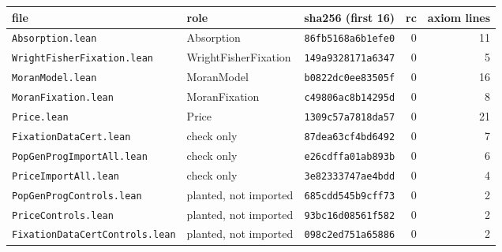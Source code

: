 \begin{tabular}{llrrr}
\toprule
file & role & sha256 (first 16) & rc & axiom lines\\
\midrule
\texttt{Absorption.lean} & Absorption & \texttt{86fb5168a6b1efe0} & 0 & 11 \\
\texttt{WrightFisherFixation.lean} & WrightFisherFixation & \texttt{149a9328171a6347} & 0 & 5 \\
\texttt{MoranModel.lean} & MoranModel & \texttt{b0822dc0ee83505f} & 0 & 16 \\
\texttt{MoranFixation.lean} & MoranFixation & \texttt{c49806ac8b14295d} & 0 & 8 \\
\texttt{Price.lean} & Price & \texttt{1309c57a7818da57} & 0 & 21 \\
\texttt{FixationDataCert.lean} & check only & \texttt{87dea63cf4bd6492} & 0 & 7 \\
\texttt{PopGenProgImportAll.lean} & check only & \texttt{e26cdffa01ab893b} & 0 & 6 \\
\texttt{PriceImportAll.lean} & check only & \texttt{3e82333747ae4bdd} & 0 & 4 \\
\texttt{PopGenProgControls.lean} & planted, not imported & \texttt{685cdd545b9cff73} & 0 & 2 \\
\texttt{PriceControls.lean} & planted, not imported & \texttt{93bc16d08561f582} & 0 & 2 \\
\texttt{FixationDataCertControls.lean} & planted, not imported & \texttt{098c2ed751a65886} & 0 & 2 \\
\bottomrule
\end{tabular}
